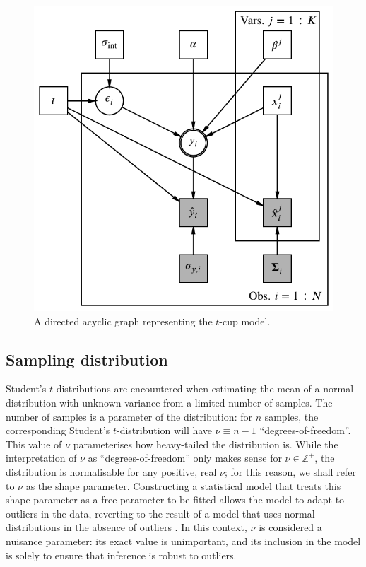 \documentclass[fleqn,usenatbib]{mnras}
\begin{document}
\begin{figure}
	\includegraphics[width=\columnwidth]{graphics/dag.pdf}
    \caption{A directed acyclic graph representing the $t$-cup model.}
    \label{fig:formalism.dag}
\end{figure}

\subsection{Sampling distribution}
\label{sec:formalism.sampling}

Student's $t$-distributions are encountered when estimating the mean of a normal
distribution with unknown variance from a limited number of samples. The number
of samples is a parameter of the distribution: for $n$ samples, the
corresponding Student's $t$-distribution will have $\nu \equiv n - 1$
``degrees-of-freedom''. This value of $\nu$ parameterises how heavy-tailed the
distribution is. While the interpretation of $\nu$ as ``degrees-of-freedom''
only makes sense for $\nu \in \mathbb Z^+$, the distribution is normalisable for
any positive, real $\nu$; for this reason, we shall refer to $\nu$ as the shape
parameter. Constructing a statistical model that treats this shape parameter as
a free parameter to be fitted allows the model to adapt to outliers in the data,
reverting to the result of a model that uses normal distributions in the absence
of outliers \citep{Feeney:2018}. In this context, $\nu$ is considered a
nuisance parameter: its exact value is unimportant, and its inclusion in the
model is solely to ensure that inference is robust to outliers.
\end{document}
